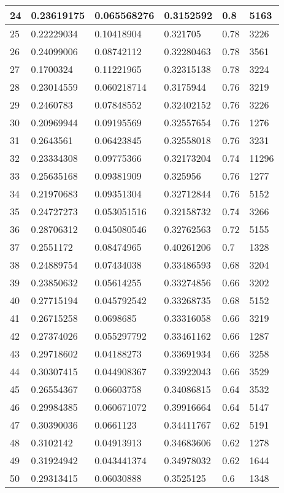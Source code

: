 \begin{longtable}{|l|l|l|l|l|l|}
24 & 0.23619175 & 0.065568276 & 0.3152592 & 0.8 & 5163 \\ \hline 
25 & 0.22229034 & 0.10418904 & 0.321705 & 0.78 & 3226 \\ \hline 
26 & 0.24099006 & 0.08742112 & 0.32280463 & 0.78 & 3561 \\ \hline 
27 & 0.1700324 & 0.11221965 & 0.32315138 & 0.78 & 3224 \\ \hline 
28 & 0.23014559 & 0.060218714 & 0.3175944 & 0.76 & 3219 \\ \hline 
29 & 0.2460783 & 0.07848552 & 0.32402152 & 0.76 & 3226 \\ \hline 
30 & 0.20969944 & 0.09195569 & 0.32557654 & 0.76 & 1276 \\ \hline 
31 & 0.2643561 & 0.06423845 & 0.32558018 & 0.76 & 3231 \\ \hline 
32 & 0.23334308 & 0.09775366 & 0.32173204 & 0.74 & 11296 \\ \hline 
33 & 0.25635168 & 0.09381909 & 0.325956 & 0.76 & 1277 \\ \hline 
34 & 0.21970683 & 0.09351304 & 0.32712844 & 0.76 & 5152 \\ \hline 
35 & 0.24727273 & 0.053051516 & 0.32158732 & 0.74 & 3266 \\ \hline 
36 & 0.28706312 & 0.045080546 & 0.32762563 & 0.72 & 5155 \\ \hline 
37 & 0.2551172 & 0.08474965 & 0.40261206 & 0.7 & 1328 \\ \hline 
38 & 0.24889754 & 0.07434038 & 0.33486593 & 0.68 & 3204 \\ \hline 
39 & 0.23850632 & 0.05614255 & 0.33274856 & 0.66 & 3202 \\ \hline 
40 & 0.27715194 & 0.045792542 & 0.33268735 & 0.68 & 5152 \\ \hline 
41 & 0.26715258 & 0.0698685 & 0.33316058 & 0.66 & 3219 \\ \hline 
42 & 0.27374026 & 0.055297792 & 0.33461162 & 0.66 & 1287 \\ \hline 
43 & 0.29718602 & 0.04188273 & 0.33691934 & 0.66 & 3258 \\ \hline 
44 & 0.30307415 & 0.044908367 & 0.33922043 & 0.66 & 3529 \\ \hline 
45 & 0.26554367 & 0.06603758 & 0.34086815 & 0.64 & 3532 \\ \hline 
46 & 0.29984385 & 0.060671072 & 0.39916664 & 0.64 & 5147 \\ \hline 
47 & 0.30390036 & 0.0661123 & 0.34411767 & 0.62 & 5191 \\ \hline 
48 & 0.3102142 & 0.04913913 & 0.34683606 & 0.62 & 1278 \\ \hline 
49 & 0.31924942 & 0.043441374 & 0.34978032 & 0.62 & 1644 \\ \hline 
50 & 0.29313415 & 0.06030888 & 0.3525125 & 0.6 & 1348 \\ \hline 
\end{longtable}